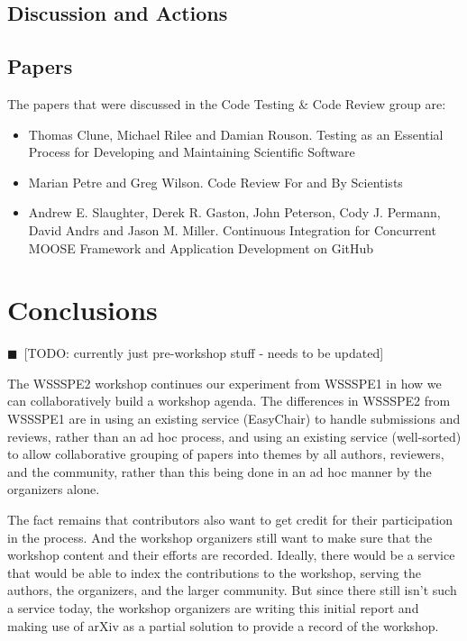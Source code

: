 \documentclass[11pt, oneside]{amsart}
\newcommand{\todo}[1]{{\color{blue}$\blacksquare$~\textsf{[TODO: #1]}}}
\begin{document}
\subsection{Discussion and Actions}

\subsection{Papers}

The papers that were discussed in the Code Testing \& Code Review group are:
\begin{itemize}
\item Thomas Clune, Michael Rilee and Damian Rouson. Testing as an Essential
Process for Developing and Maintaining Scientific Software~\cite{wssspe2_clune}

\item Marian Petre and Greg Wilson. Code Review For and By
Scientists~\cite{wssspe2_petre}

\item Andrew E. Slaughter, Derek R. Gaston, John Peterson, Cody J. Permann,
David Andrs and Jason M. Miller. Continuous Integration for Concurrent {MOOSE}
Framework and Application Development on {GitHub}~\cite{wssspe2_slaughter}
\end{itemize}

\section{Conclusions} \label{sec:conclusions}
\todo{currently just pre-workshop stuff - needs to be updated}

The WSSSPE2 workshop continues our experiment from WSSSPE1 in how we can
collaboratively build a workshop agenda. The differences in WSSSPE2 from WSSSPE1
are in using an existing service (EasyChair) to handle submissions and reviews,
rather than an ad hoc process, and using an existing service (well-sorted) to
allow collaborative grouping of papers into themes by all authors, reviewers,
and the community, rather than this being done in an ad hoc manner by the
organizers alone.

The fact remains that contributors also want to get credit for their
participation in the process. And the workshop organizers still want to make
sure that the workshop content and their efforts are recorded. Ideally, there
would be a service that would be able to index the contributions to the
workshop, serving the authors, the organizers, and the larger community. But
since there still isn't such a service today, the workshop organizers are
writing this initial report and making use of arXiv as a partial solution to
provide a record of the workshop.
\end{document}
